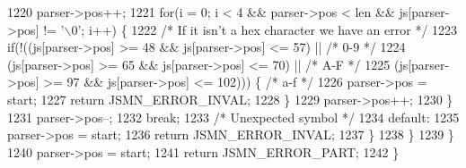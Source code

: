 \begin{DoxyCode}
1220                     parser->pos++;
1221                     \textcolor{keywordflow}{for}(i = 0; i < 4 && parser->pos < len && js[parser->pos] != \textcolor{charliteral}{'\(\backslash\)0'}; i++) \{
1222                         \textcolor{comment}{/* If it isn't a hex character we have an error */}
1223                         \textcolor{keywordflow}{if}(!((js[parser->pos] >= 48 && js[parser->pos] <= 57) || \textcolor{comment}{/* 0-9 */}
1224                                     (js[parser->pos] >= 65 && js[parser->pos] <= 70) || \textcolor{comment}{/* A-F */}
1225                                     (js[parser->pos] >= 97 && js[parser->pos] <= 102))) \{ \textcolor{comment}{/* a-f */}
1226                             parser->pos = start;
1227                             \textcolor{keywordflow}{return} JSMN_ERROR_INVAL;
1228                         \}
1229                         parser->pos++;
1230                     \}
1231                     parser->pos--;
1232                     \textcolor{keywordflow}{break};
1233                 \textcolor{comment}{/* Unexpected symbol */}
1234                 \textcolor{keywordflow}{default}:
1235                     parser->pos = start;
1236                     \textcolor{keywordflow}{return} JSMN_ERROR_INVAL;
1237             \}
1238         \}
1239     \}
1240     parser->pos = start;
1241     \textcolor{keywordflow}{return} JSMN_ERROR_PART;
1242 \}
\end{DoxyCode}
